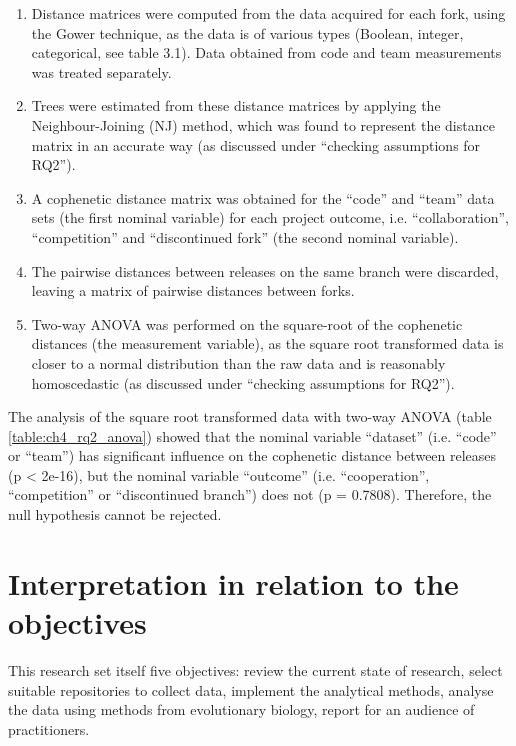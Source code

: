 \begin{enumerate}
\item{Distance matrices were computed from the data acquired for each fork, using the Gower technique, as the data is of various types (Boolean, integer, categorical, see table 3.1). Data obtained from code and team measurements was treated separately.}
\item{Trees were estimated from these distance matrices by applying the Neighbour-Joining (NJ) method, which was found to represent the distance matrix in an accurate way (as discussed under “checking assumptions for RQ2”).}
\item{A cophenetic distance matrix was obtained for the “code” and “team” data sets (the first nominal variable) for each project outcome, i.e. “collaboration”, “competition” and “discontinued fork” (the second nominal variable).}
\item{The pairwise distances between releases on the same branch were discarded, leaving a matrix of pairwise distances between forks.}
\item{Two-way ANOVA was performed on the square-root of the cophenetic distances (the measurement variable), as the square root transformed data is closer to a normal distribution than the raw data and is reasonably homoscedastic (as discussed under “checking assumptions for RQ2”).}
\end{enumerate}

The analysis of the square root transformed data with two-way ANOVA (table \ref{table:ch4_rq2_anova}) showed that the nominal variable “dataset” (i.e. “code” or “team”) has significant influence on the cophenetic distance between releases (p < 2e-16), but the nominal variable “outcome” (i.e. “cooperation”, “competition” or “discontinued branch”) does not (p = 0.7808). Therefore, the null hypothesis cannot be rejected.




\section{Interpretation in relation to the objectives}
This research set itself five objectives: review the current state of research, select suitable repositories to collect data, implement the analytical methods, analyse the data using methods from evolutionary biology, report for an audience of practitioners.


